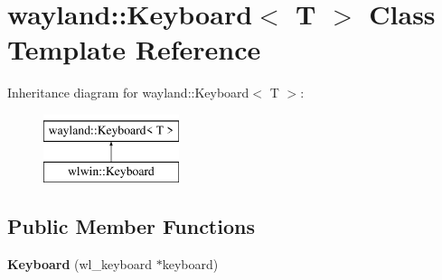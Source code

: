 \hypertarget{classwayland_1_1Keyboard}{}\section{wayland\+::Keyboard$<$ T $>$ Class Template Reference}
\label{classwayland_1_1Keyboard}
Inheritance diagram for wayland\+::Keyboard$<$ T $>$\+:\begin{figure}[H]
\begin{center}
\leavevmode
\includegraphics[height=2.000000cm]{classwayland_1_1Keyboard}
\end{center}
\end{figure}
\subsection*{Public Member Functions}
\begin{DoxyCompactItemize}
\item 
\mbox{\label{classwayland_1_1Keyboard_a72ade70229d3229a72c13382cc74cd40}} 
{\bfseries Keyboard} (wl\+\_\+keyboard $\ast$keyboard)
\end{DoxyCompactItemize}
